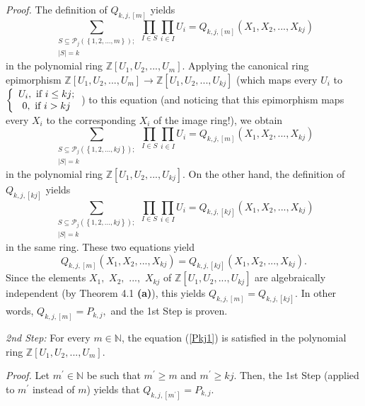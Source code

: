 \documentclass[12pt,final,notitlepage,onecolumn,german]{article}%
\begin{document}
\textit{Proof.} The definition of $Q_{k,j,\left[  m\right]  }$ yields
\[
\sum_{\substack{S\subseteq\mathcal{P}_{j}\left(  \left\{  1,2,...,m\right\}
\right)  ;\\\left\vert S\right\vert =k}}\prod_{I\in S}\prod_{i\in I}%
U_{i}=Q_{k,j,\left[  m\right]  }\left(  X_{1},X_{2},...,X_{kj}\right)
\]
in the polynomial ring $\mathbb{Z}\left[  U_{1},U_{2},...,U_{m}\right]  $.
Applying the canonical ring epimorphism $\mathbb{Z}\left[  U_{1}%
,U_{2},...,U_{m}\right]  \rightarrow\mathbb{Z}\left[  U_{1},U_{2}%
,...,U_{kj}\right]  $ (which maps every $U_{i}$ to $\left\{
\begin{array}
[c]{c}%
U_{i},\text{ if }i\leq kj;\\
0,\text{ if }i>kj
\end{array}
\right.  $) to this equation (and noticing that this epimorphism maps every
$X_{i}$ to the corresponding $X_{i}$ of the image ring!), we obtain%
\[
\sum_{\substack{S\subseteq\mathcal{P}_{j}\left(  \left\{  1,2,...,kj\right\}
\right)  ;\\\left\vert S\right\vert =k}}\prod_{I\in S}\prod_{i\in I}%
U_{i}=Q_{k,j,\left[  m\right]  }\left(  X_{1},X_{2},...,X_{kj}\right)
\]
in the polynomial ring $\mathbb{Z}\left[  U_{1},U_{2},...,U_{kj}\right]  $. On
the other hand, the definition of $Q_{k,j,\left[  kj\right]  }$ yields%
\[
\sum_{\substack{S\subseteq\mathcal{P}_{j}\left(  \left\{  1,2,...,kj\right\}
\right)  ;\\\left\vert S\right\vert =k}}\prod_{I\in S}\prod_{i\in I}%
U_{i}=Q_{k,j,\left[  kj\right]  }\left(  X_{1},X_{2},...,X_{kj}\right)
\]
in the same ring. These two equations yield%
\[
Q_{k,j,\left[  m\right]  }\left(  X_{1},X_{2},...,X_{kj}\right)
=Q_{k,j,\left[  kj\right]  }\left(  X_{1},X_{2},...,X_{kj}\right)  .
\]
Since the elements $X_{1},$ $X_{2},$ $...,$ $X_{kj}$ of $\mathbb{Z}\left[
U_{1},U_{2},...,U_{kj}\right]  $ are algebraically independent (by Theorem 4.1
\textbf{(a)}), this yields $Q_{k,j,\left[  m\right]  }=Q_{k,j,\left[
kj\right]  }.$ In other words, $Q_{k,j,\left[  m\right]  }=P_{k,j},$ and the
1st Step is proven.

\textit{2nd Step:} For every $m\in\mathbb{N}$, the equation (\ref{Pkj1}) is
satisfied in the polynomial ring $\mathbb{Z}\left[  U_{1},U_{2},...,U_{m}%
\right]  $.

\textit{Proof.} Let $m^{\prime}\in\mathbb{N}$ be such that $m^{\prime}\geq m$
and $m^{\prime}\geq kj$. Then, the 1st Step (applied to $m^{\prime}$ instead
of $m$) yields that $Q_{k,j,\left[  m^{\prime}\right]  }=P_{k,j}.$
\end{document}

